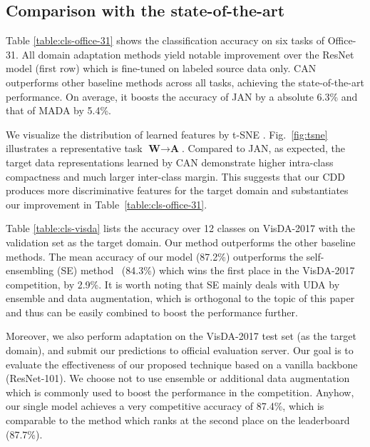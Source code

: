 \documentclass[10pt,twocolumn,letterpaper]{article}
\begin{document}
\subsection{Comparison with the state-of-the-art}\label{sec:soa}
Table \ref{table:cls-office-31} shows the classification accuracy on six tasks of Office-31. 
All domain adaptation methods yield notable improvement over the ResNet model (first row) which is fine-tuned on labeled source data only. CAN outperforms other baseline methods across all tasks, achieving the state-of-the-art performance. On average, it boosts the accuracy of JAN by a absolute 6.3\% and that of MADA by 5.4\%.


We visualize the distribution of learned features by t-SNE \cite{maaten2008visualizing}. Fig.~\ref{fig:tsne} illustrates a representative task $\textbf{W} \rightarrow \textbf{A}$.
Compared to JAN,
as expected, the target data representations learned by CAN
demonstrate higher intra-class compactness 
and much larger inter-class margin. 
This suggests that our CDD produces more discriminative features for the target domain and substantiates our improvement in Table~\ref{table:cls-office-31}. 


Table \ref{table:cls-visda} lists the accuracy over 12 classes on VisDA-2017 with the validation set as the target domain. 
Our method outperforms the other baseline methods.
The mean accuracy of our model (87.2\%) outperforms
the self-ensembling (SE) method~\cite{french2017self} (84.3\%)
which wins the first place in the VisDA-2017 competition, by 2.9\%.
It is worth noting that SE mainly deals with UDA by ensemble and data augmentation,
which is orthogonal to the topic of this paper and thus can be easily combined to boost the performance further.

Moreover, we also perform adaptation on the VisDA-2017 test set (as the target
domain), and submit our predictions to official evaluation server. Our goal is to evaluate the effectiveness of our proposed technique based on a vanilla backbone (ResNet-101). We choose not to use ensemble or additional data augmentation which is commonly used to boost the performance in the competition.
Anyhow, our single model achieves a very competitive accuracy of 87.4\%, which 
is comparable to the method which ranks at the second place on the leaderboard (87.7\%).
\end{document}
